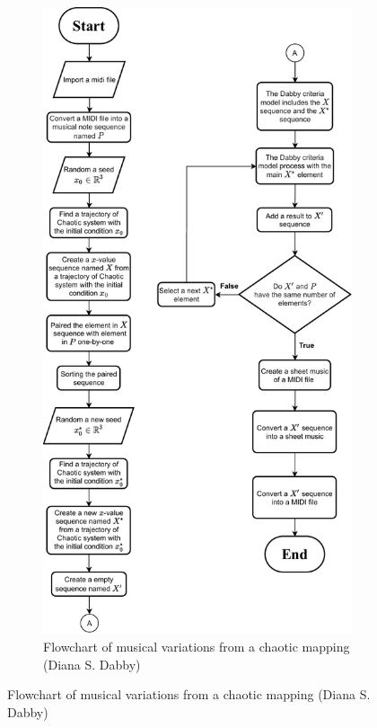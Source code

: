 \documentclass[11pt]{article}
\begin{document}
\begin{figure}
\centering
\begin{subfigure}{0.45\textwidth}
  \centering
  \includegraphics[scale=0.55]{Dabby_process.pdf}
  \caption{Flowchart of musical variations from a chaotic mapping (Diana S. Dabby)}

\end{subfigure}
\end{figure}
\end{document}
